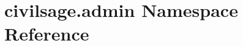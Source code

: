 \hypertarget{namespacecivilsage_1_1admin}{}\section{civilsage.\+admin Namespace Reference}
\label{namespacecivilsage_1_1admin}
